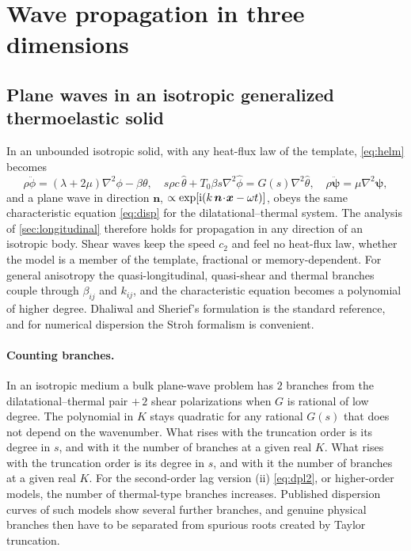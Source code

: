 \section{Wave propagation in three dimensions}\label{sec:waves3d}
\subsection{Plane waves in an isotropic generalized thermoelastic solid}
In an unbounded isotropic solid, with any heat-flux law of the template, \eqref{eq:helm} becomes
\begin{equation}
\rho\ddot\phi=(\lambda+2\mu)\nabla^2\phi-\beta\theta,\quad
s\rho c\,\hat\theta+T_0\beta s\nabla^2\hat\phi=G(s)\nabla^2\hat\theta,\quad
\rho\ddot{\bm\psi}=\mu\nabla^2\bm\psi,
\end{equation}
and a plane wave in direction $\bm n$, $\propto\exp[\mathrm i(k\,\bm n\!\cdot\!\bm x-\omega t)]$, obeys the same characteristic equation \eqref{eq:disp} for the dilatational--thermal system. The analysis of \cref{sec:longitudinal} therefore holds for propagation in any direction of an isotropic body. Shear waves keep the speed $c_2$ and feel no heat-flux law, whether the model is a member of the template, fractional or memory-dependent. For general anisotropy the quasi-longitudinal, quasi-shear and thermal branches couple through $\beta_{ij}$ and $k_{ij}$, and the characteristic equation becomes a polynomial of higher degree. Dhaliwal and Sherief's formulation \citep{Dhaliwal1980} is the standard reference, and for numerical dispersion the Stroh formalism \citep{Stroh1958,Stroh1962} is convenient.

\paragraph{Counting branches.} In an isotropic medium a bulk plane-wave problem has $2$ branches from the dilatational--thermal pair $+\,2$ shear polarizations when $G$ is rational of low degree. The polynomial in $K$ stays quadratic for any rational $G(s)$ that does not depend on the wavenumber. What rises with the truncation order is its degree in $s$, and with it the number of branches at a given real $K$. What rises with the truncation order is its degree in $s$, and with it the number of branches at a given real $K$. For the second-order lag version (ii) \eqref{eq:dpl2}, or higher-order models, the number of thermal-type branches increases. Published dispersion curves of such models show several further branches, and genuine physical branches then have to be separated from spurious roots created by Taylor truncation.


